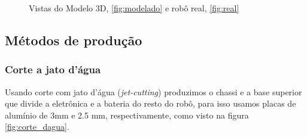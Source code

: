 \documentclass[conference]{IEEEtran}
\begin{document}
\begin{figure}[thpb]
    \caption{Vistas do Modelo 3D, \ref{fig:modelado} e robô real, \ref{fig:real}}
    \label{fig:robo_3d_e_real}
\end{figure}

\subsection{Métodos de produção}

\subsubsection {Corte a jato d'água}

Usando corte com jato d’água (\textit{jet-cutting}) produzimos o chassi e a base superior que divide a eletrônica e a bateria do resto do robô, para isso usamos placas de alumínio de 3mm e 2.5 mm, respectivamente, como visto na figura \ref{fig:corte_dagua}.
\end{document}
